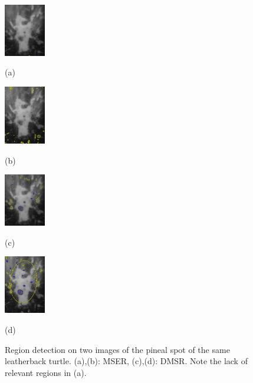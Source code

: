 \documentclass[conference,compsoc]{IEEEtran}
\begin{document}
\begin{figure}[htb]

\begin{minipage}[b]{.23\linewidth}
  \centering
  \centerline{\includegraphics[width=1.8cm]{mserLeatherbackA}}
   \centerline{(a)}\medskip
\end{minipage}
\hfill
\begin{minipage}[b]{0.23\linewidth}
  \centering
  \centerline{\includegraphics[width=1.8cm]{mserLeatherbackB}}
\centerline{(b)}\medskip
\end{minipage}
\hfill
\begin{minipage}[b]{.23\linewidth}
  \centering
  \centerline{\includegraphics[width=1.8cm]{dmsrLeatherbackA}}
\centerline{(c)}\medskip
\end{minipage}
\hfill
\begin{minipage}[b]{0.23\linewidth}
  \centering
  \centerline{\includegraphics[width=1.8cm]{dmsrLeatherbackB}}
 \centerline{(d)}\medskip
\end{minipage}
 \vspace{-0.2cm} 
\caption{Region detection on two images of the pineal spot of the same leatherback turtle.
(a),(b): MSER, (c),(d): DMSR. Note the lack of relevant regions in (a).}
\label{fig:turtle}
 \vspace{-0.2cm}
\end{figure}
\end{document}
